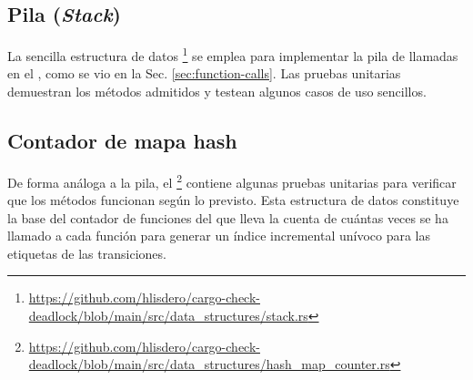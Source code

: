 \subsection{Pila (\textit{Stack})}

La sencilla estructura de datos
\footnote{\url{https://github.com/hlisdero/cargo-check-deadlock/blob/main/src/data_structures/stack.rs}}
se emplea para implementar la pila de llamadas en el , como se
vio en la Sec. \ref{sec:function-calls}.
Las pruebas unitarias demuestran los métodos admitidos y testean algunos casos de uso sencillos.

\subsection{Contador de mapa hash}

De forma análoga a la pila,
el \footnote{\url{https://github.com/hlisdero/cargo-check-deadlock/blob/main/src/data_structures/hash_map_counter.rs}}
contiene algunas pruebas unitarias para
verificar que los métodos funcionan según lo previsto.
Esta estructura de datos constituye la
base del contador de funciones del 
que lleva la cuenta de cuántas veces se ha llamado a cada función para generar un índice
incremental unívoco para las etiquetas de las transiciones.